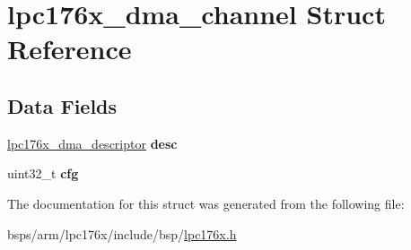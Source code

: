 \hypertarget{structlpc176x__dma__channel}{}\section{lpc176x\+\_\+dma\+\_\+channel Struct Reference}
\label{structlpc176x__dma__channel}
\subsection*{Data Fields}
\begin{DoxyCompactItemize}
\item 
\mbox{\label{structlpc176x__dma__channel_a55b4865f5bdf89193d6d79347564c6ea}} 
\mbox{\hyperlink{structlpc176x__dma__descriptor}{lpc176x\+\_\+dma\+\_\+descriptor}} {\bfseries desc}
\item 
\mbox{\label{structlpc176x__dma__channel_a6930a549664e34af2445ccb1f1fd3ed6}} 
uint32\+\_\+t {\bfseries cfg}
\end{DoxyCompactItemize}


The documentation for this struct was generated from the following file\+:\begin{DoxyCompactItemize}
\item 
bsps/arm/lpc176x/include/bsp/\mbox{\hyperlink{lpc176x_8h}{lpc176x.\+h}}\end{DoxyCompactItemize}
